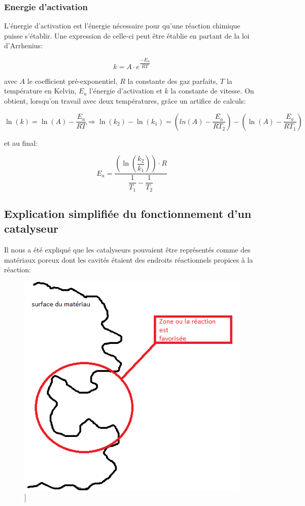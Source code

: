 \subsubsection*{Energie d'activation}
L'énergie d'activation est l'énergie nécessaire pour qu'une réaction chimique puisse s'établir. Une expression de celle-ci peut être établie en partant de la loi d'Arrhenius:

$$k=A\cdot e^{\dfrac{-E_a}{RT}}$$

avec $A$ le coefficient pré-exponentiel, $R$ la constante des gaz parfaits, $T$ la température en Kelvin, $E_a$ l'énergie d'activation et $k$ la constante de vitesse.
On obtient, lorsqu'on travail avec deux températures, grâce un artifice de calculs:

$$\ln(k) = \ln(A) - \dfrac{E_a}{RT}   \Rightarrow   \ln(k_2) - \ln(k_1) = \left( ln(A) - \dfrac{E_a}{RT_2} \right) - \left( \ln(A) - \dfrac{E_a}{RT_1} \right)$$

et au final:

$$E_a = \dfrac{\left( \ln \left( \dfrac{k_2}{k_1}\right) \right) \cdot R}{\dfrac{1}{T_1} - \dfrac{1}{T_2}}$$

\subsection*{Explication simplifiée du fonctionnement d'un catalyseur}
Il nous a été expliqué que les catalyseurs pouvaient être représentés comme des matériaux poreux dont les cavités étaient des endroits réactionnels propices à la réaction:

\begin{figure} [h]
\begin{center}
\includegraphics[scale=0.5]{cata}]
\end{center}
\end{figure}

